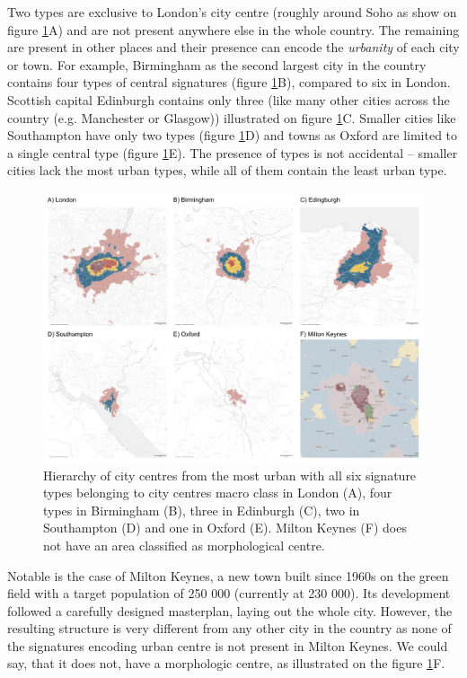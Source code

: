Two types are exclusive to London's city centre (roughly around Soho as show on figure
\ref{fig:centres}A) and are not present anywhere else in the whole country. The
remaining are present in other places and their presence can encode the
\textit{urbanity} of each city or town. For example, Birmingham as the second largest
city in the country contains four types of central signatures (figure
\ref{fig:centres}B), compared to six in London. Scottish capital Edinburgh contains only
three (like many other cities across the country (e.g. Manchester or Glasgow))
illustrated on figure \ref{fig:centres}C. Smaller cities like Southampton have only two
types (figure \ref{fig:centres}D) and towns as Oxford are limited to a single central
type (figure \ref{fig:centres}E). The presence of types is not accidental -- smaller
cities lack the most urban types, while all of them contain the least urban type.

\begin{figure}
    \includegraphics[width=0.75\linewidth, center]{fig/centres.png}
    \caption{Hierarchy of city centres from the most urban with all six signature types
    belonging to city centres macro class in London (A), four types in Birmingham (B),
    three in Edinburgh (C), two in Southampton (D) and one in Oxford (E). Milton Keynes
    (F) does not have an area classified as morphological centre.}
    \label{fig:centres}
\end{figure}

Notable is the case of Milton Keynes, a new town built since 1960s on the green field
with a target population of 250 000 (currently at 230 000). Its development followed a
carefully designed masterplan, laying out the whole city. However, the resulting
structure is very different from any other city in the country as none of the signatures
encoding urban centre is not present in Milton Keynes. We could say, that it does not,
have a morphologic centre, as illustrated on the figure \ref{fig:centres}F.
